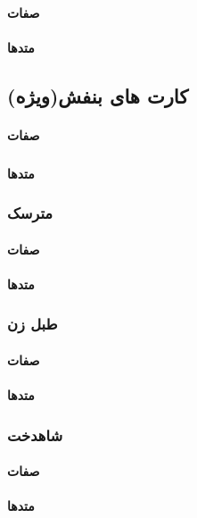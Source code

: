 \documentclass[pdf,titlepage,a4paper]{report}
\begin{document}
	\paragraph{صفات}
	\paragraph{متدها}
	
	
	\subsection{کارت های بنفش(ویژه)}
	\paragraph{صفات}
	\subparagraph{}
	
	\paragraph{متدها}
	
	\subsubsection{مترسک}
	\paragraph{صفات}
	\paragraph{متدها}
	
	\subsubsection{طبل زن}
	\paragraph{صفات}
	\paragraph{متدها}
	
	\subsubsection{شاهدخت}
	\paragraph{صفات}
	\paragraph{متدها}
	
\end{document}
